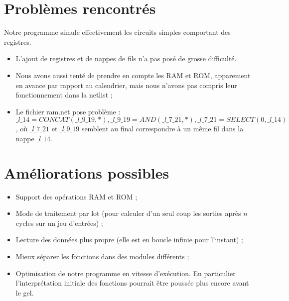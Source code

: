 \documentclass[a4paper]{article}
\begin{document}
\section{Problèmes rencontrés}

Notre programme simule effectivement les circuits
simples comportant des registres.
\begin{itemize}
    \item L'ajout de registres et de nappes de fils n'a pas posé de
grosse difficulté.
    \item Nous avons aussi tenté de prendre en compte les RAM et ROM,
apparement en avance par rapport au calendrier, mais nous n'avons pas
compris leur fonctionnement dans la netlist ;
    \item Le fichier ram.net pose problème : $\_l\_14 =
CONCAT(\_l\_9\_19,*), \_l\_9\_19 = AND(\_l\_7\_21,*), \_l\_7\_21 =
SELECT(0,\_l\_14)$, où $\_l\_7\_21$ et $\_l\_9\_19$ semblent au final
correspondre à un même fil dans la nappe $\_l\_14$.
\end{itemize}

\section{Améliorations possibles}

\begin{itemize}
    \item Support des opérations RAM et ROM ;
    \item Mode de traitement par lot (pour calculer d'un seul coup les sorties après $n$ cycles sur un jeu d'entrées) ;
    \item Lecture des données plus propre (elle est en boucle
infinie pour l'instant) ;
    \item Mieux séparer les fonctions dans des modules différents ;
    \item Optimisation de notre programme en vitesse d'exécution. En particulier l'interprétation initiale des fonctions pourrait être poussée plus encore avant le gel.
\end{itemize}

\end{document}
